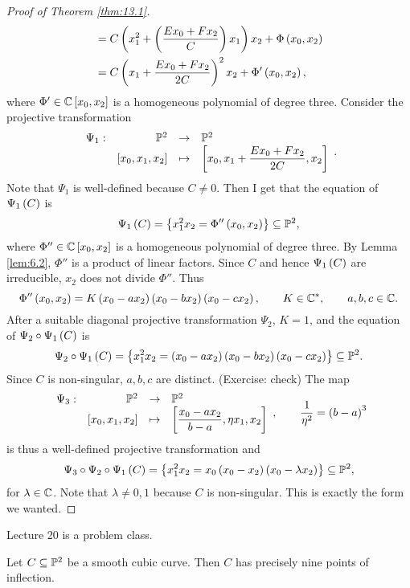 \begin{proof}[Proof of Theorem \ref{thm:13.1}]
\begin{align*}
& = C\rb{x_1^2 + \rb{\dfrac{Ex_0 + Fx_2}{C}}x_1}x_2 + \Phi\rb{x_0, x_2} \\
& = C\rb{x_1 + \dfrac{Ex_0 + Fx_2}{2C}}^2x_2 + \Phi'\rb{x_0, x_2},
\end{align*}
where $ \Phi' \in \C\sb{x_0, x_2} $ is a homogeneous polynomial of degree three. Consider the projective transformation
$$ \function[\Psi_1]{\P^2}{\P^2}{\sb{x_0, x_1, x_2}}{\sb{x_0, x_1 + \dfrac{Ex_0 + Fx_2}{2C}, x_2}}. $$
Note that $ \Psi_1 $ is well-defined because $ C \ne 0 $. Then I get that the equation of $ \Psi_1\rb{C} $ is
$$ \Psi_1\rb{C} = \cb{x_1^2x_2 = \Phi''\rb{x_0, x_2}} \subseteq \P^2, $$
where $ \Phi'' \in \C\sb{x_0, x_2} $ is a homogeneous polynomial of degree three. By Lemma \ref{lem:6.2}, $ \Phi'' $ is a product of linear factors. Since $ C $ and hence $ \Psi_1\rb{C} $ are irreducible, $ x_2 $ does not divide $ \Phi'' $. Thus
$$ \Phi''\rb{x_0, x_2} = K\rb{x_0 - ax_2}\rb{x_0 - bx_2}\rb{x_0 - cx_2}, \qquad K \in \C^*, \qquad a, b, c \in \C. $$
After a suitable diagonal projective transformation $ \Psi_2 $, $ K = 1 $, and the equation of $ \Psi_2 \circ \Psi_1\rb{C} $ is
$$ \Psi_2 \circ \Psi_1\rb{C} = \cb{x_1^2x_2 = \rb{x_0 - ax_2}\rb{x_0 - bx_2}\rb{x_0 - cx_2}} \subseteq \P^2. $$
Since $ C $ is non-singular, $ a, b, c $ are distinct. (Exercise: check) The map
$$ \function[\Psi_3]{\P^2}{\P^2}{\sb{x_0, x_1, x_2}}{\sb{\dfrac{x_0 - ax_2}{b - a}, \eta x_1, x_2}}, \qquad \dfrac{1}{\eta^2} = \rb{b - a}^3 $$
is thus a well-defined projective transformation and
$$ \Psi_3 \circ \Psi_2 \circ \Psi_1\rb{C} = \cb{x_1^2x_2 = x_0\rb{x_0 - x_2}\rb{x_0 - \lambda x_2}} \subseteq \P^2, $$
for $ \lambda \in \C $. Note that $ \lambda \ne 0, 1 $ because $ C $ is non-singular. This is exactly the form we wanted.
\end{proof}


Lecture 20 is a problem class.


\begin{corollary}
Let $ C \subseteq \P^2 $ be a smooth cubic curve. Then $ C $ has precisely nine points of inflection.
\end{corollary}

